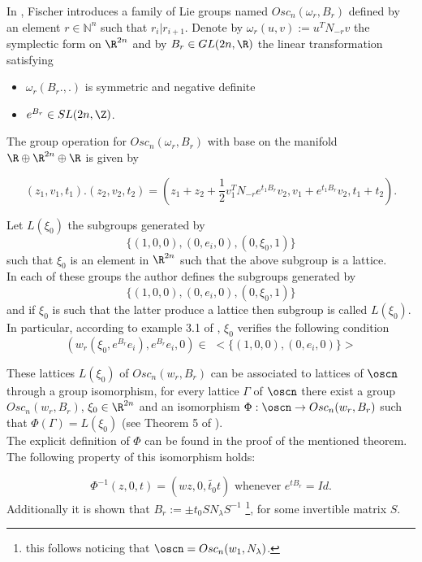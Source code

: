 \documentclass[11pt]{amsart}
\theoremstyle{plain}
\theoremstyle{definition}
\theoremstyle{remark}
\begin{document}
In \cite{MF}, Fischer introduces a family of Lie groups named $Osc_n(\omega_r, B_r)$ defined by an element $r \in \mathbb{N}^n$ such that $r_i | r_{i+1}$. Denote by $\omega_r(u,v):=u^TN_{-r}v$ the symplectic form on $\R^{2n}$ and by $B_r \in GL(2n, \R)$ the linear transformation satisfying

\begin{itemize}
    \item $\omega_r(B_r.,.)$ is symmetric and negative definite
    \item $e^{B_r} \in SL(2n,\Z)$.
\end{itemize}

The group operation for $Osc_n(\omega_r, B_r)$ with base on the manifold $\R \oplus \R^{2n} \oplus \R$ is given by

\begin{equation}
    (z_1,v_1,t_1) . (z_2,v_2,t_2)=(z_1+z_2+\frac{1}{2}v_1^{T}N_{-r} e^{t_1 B_r}v_2,v_1+e^{t_1 B_r}v_2,t_1+t_2).
\end{equation}

Let $L(\xi_0)$ the subgroups generated by $$\{ (1,0,0),(0,e_i,0),(0,\xi_0, 1) \}$$ such that $\xi_0$ is an element in $\R^{2n}$ such that the above subgroup is a lattice. \\

In each of these groups the author defines the subgroups generated by $$\{ (1,0,0),(0,e_i,0),(0,\xi_0, 1) \}$$ and if $\xi_0$ is such that the latter produce a lattice then subgroup is called $L(\xi_0)$. In particular, according to example 3.1 of \cite{MF}, $\xi_0$ verifies the following condition 
\begin{equation}\label{xi-condition}
    (w_r(\xi_0, e^{B_r}e_i), e^{B_r} e_i, 0) \in \,\, <\{ (1,0,0),(0,e_i,0) \}>
\end{equation}


These lattices $L(\xi_0)$ of $Osc_n(w_r, B_r)$ can be associated to lattices of $\oscn$ through a group isomorphism, for every lattice $\Gamma$ of $\oscn$ there exist a group $Osc_n(w_r, B_r)$, $\xi_0 \in \R^{2n}$ and an isomorphism $\Phi: \oscn \rightarrow Osc_n(w_r, B_r)$ such that $\Phi(\Gamma) = L(\xi_0)$ (see Theorem 5 of \cite{MF}). \\

The explicit definition of $\Phi$ can be found in the proof of the mentioned theorem. The following property of this isomorphism holds:

\begin{equation} \label{condition-exp}
    \Phi^{-1}(z,0,t) = (w z, 0, \widetilde{t_0} t ) \mbox{ whenever } e^{t B_r} = Id.
\end{equation}
Additionally it is shown that $B_r := \pm t_0 S N_{\lambda} S^{-1}$ \footnote{this follows noticing that $\oscn = Osc_n(w_{1}, N_{\lambda})$.}, for some invertible matrix $S$. 
\end{document}
